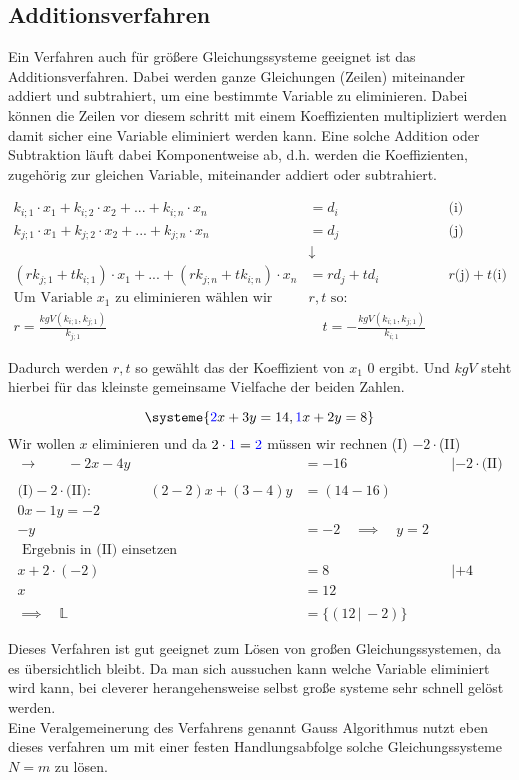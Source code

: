 \documentclass[a4paper,12pt]{article}
\newcommand{\Redbox}[1]{
	{
		\vspace*{0.1cm}
		\begin{tcolorbox}[breakable,colback=yellow!0,colframe=red!65!black,width=\linewidth ]
			{#1}
		\end{tcolorbox}
		
		
	}
}
\newcommand{\Beispiel}[1]{
	\vspace*{0.2cm}
	\begin{tcolorbox}[breakable,colback=yellow!0,colframe=green!65!black,title=\textbf{Beispiel:},width=\linewidth ]
		{#1}
	\end{tcolorbox}
}
\begin{document}
	\subsection{Additionsverfahren}
	Ein Verfahren auch für größere Gleichungssysteme geeignet ist das Additionsverfahren. Dabei werden ganze Gleichungen (Zeilen) miteinander addiert und subtrahiert, um eine bestimmte Variable zu eliminieren. Dabei können die Zeilen vor diesem schritt mit einem Koeffizienten multipliziert werden damit sicher eine Variable eliminiert werden kann. Eine solche Addition oder Subtraktion läuft dabei Komponentweise ab, d.h. werden die Koeffizienten, zugehörig zur gleichen Variable, miteinander addiert oder subtrahiert.
	\Redbox{
		\begin{align*}
				k_{i;1}\cdot x_1 + k_{i;2}\cdot x_2+ ... + k_{i;n}\cdot x_n 	&=d_i&&\text{(i)}\\
				k_{j;1}\cdot x_1 + k_{j;2}\cdot x_2+ ... + k_{j;n}\cdot x_n 	&=d_j&&\text{(j)}\\
				&\downarrow\\
				(r k_{j;1} + t k_{i;1})\cdot x_1 +  ... + (r k_{j;n} + tk_{i;n})\cdot x_n 	&=r d_j + td_i &&r\text{(j)} +t\text{(i)}\\
				\text{Um Variable }x_1\text{ zu eliminieren wählen wir } &r,t\text{ so}:\\
				r=\frac{kgV(k_{i;1},k_{j;1})}{k_{j;1}}\quad & \quad t=-\frac{kgV(k_{i;1},k_{j;1})}{k_{i;1}}
		\end{align*}
	}
Dadurch werden $r,t$ so gewählt das der Koeffizient von $x_1$ 0 ergibt. Und $kgV$ steht hierbei für das kleinste gemeinsame Vielfache der beiden Zahlen.\\
\Beispiel{
	\[\systeme{
		\color{blue}2\color{black}x + 3y = 14,
		\color{blue}1\color{black}x + 2y = 8
	}\]
	Wir wollen $x$ eliminieren und da  $2 \cdot \color{blue}1\color{black} = \color{blue}2\color{black}$ müssen wir rechnen (I) $- 2\cdot $(II)
	\begin{align*}
		\rightarrow\qquad  - 2x - 4y &= -16 &&| -2\cdot \text{(II)}\\\\
		\text{(I)} - 2\cdot\text{(II)}:\qquad \qquad (2-2)x + (3-4)y&= (14 - 16)\\
		0x - 1y = -2\\
													-y&=-2 \quad\implies\quad y=2\\
													\text{ Ergebnis in (II) einsetzen}&\\
													x+ 2\cdot(-2)&=8&&|+4\\
													x&=12\\\\
													\implies \quad \mathds{L}&=\{(12\,|\,-2)\}												 
	\end{align*}
	}
	Dieses Verfahren ist gut geeignet zum Lösen von großen Gleichungssystemen, da es übersichtlich bleibt. Da man sich aussuchen kann welche Variable eliminiert wird kann, bei cleverer herangehensweise selbst große systeme sehr schnell gelöst werden.\\
	Eine Veralgemeinerung des Verfahrens genannt Gauss Algorithmus nutzt eben dieses verfahren um mit einer festen Handlungsabfolge solche Gleichungssysteme $N=m$ zu lösen.
\end{document}

